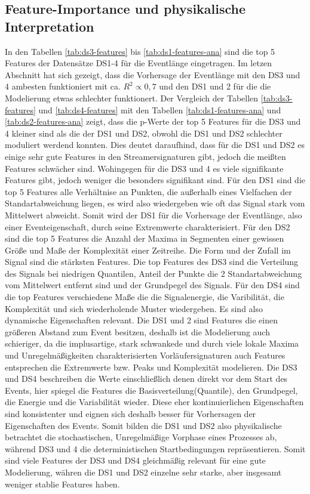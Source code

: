 \subsection{Feature-Importance und physikalische Interpretation}
In den Tabellen \ref{tab:ds3-features} bis \ref{tab:ds1-features-ana} sind die top 5 Features der Datensätze DS1-4 für die Eventlänge eingetragen. Im letzen Abschnitt hat sich gezeigt, dass die Vorhersage der Eventlänge mit den DS3 und 4 ambesten funktioniert mit ca. \(R^2 \propto 0,7\) und den DS1 und 2 für die die Modelierung etwas schlechter funktionert. Der Vergleich der Tabellen \ref{tab:ds3-features} und \ref{tab:ds4-features} mit den Tabellen \ref{tab:ds1-features-ana} und \ref{tab:ds2-features-ana} zeigt, dass die p-Werte der top 5 Features für die DS3 und 4 kleiner sind als die der DS1 und DS2, obwohl die DS1 und DS2 schlechter moduliert werdend konnten. Dies deutet daraufhind, dass für die DS1 und DS2 es einige sehr gute Features in den Streamersignaturen gibt, jedoch die meißten Features schwächer sind. Wohingegen für die DS3 und 4 es viele signifikante Features gibt, jedoch weniger die besonders signifikant sind. Für den DS1 sind die top 5 Features alle Verhältnise an Punkten, die außerhalb eines Vielfachen der Standartabweichung liegen, es wird also wiedergeben wie oft das Signal stark vom Mittelwert abweicht. Somit wird der DS1 für die Vorhersage der Eventlänge, also einer Eventeigenschaft, durch seine Extremwerte charakterisiert. Für den DS2 sind die top 5 Features die Anzahl der Maxima in Segmenten einer gewissen Größe und Maße der Komplexität einer Zeitreihe. Die Form und der Zufall im Signal sind die stärksten Features. Die top Features des DS3 sind die Verteilung des Signals bei niedrigen Quantilen, Anteil der Punkte die 2 Standartabweichung vom Mittelwert entfernt sind und der Grundpegel des Signals. Für den DS4 sind die top Features verschiedene Maße die die Signalenergie, die Varibilität, die Komplexität und sich wiederholende Muster wiedergeben. Es sind also dynamische Eigenschaften relevant. Die DS1 und 2 sind Features die einen größeren Abstand zum Event besitzen, deshalb ist die Modelierung auch schieriger, da die implusartige, stark schwankede und durch viele lokale Maxima und Unregelmäßigkeiten charakterisierten Vorläufersignaturen auch Features entsprechen die Extremwerte bzw. Peaks und Komplexität modelieren. Die DS3 und DS4 beschreiben die Werte einschließlich denen direkt vor dem Start des Events, hier spiegel die Features die Basisverteilung(Quantile), den Grundpegel, die Energie und die Variabilität wieder. Diese eher kontinuierlichen Eigenschaften sind konsistenter und eignen sich deshalb besser für Vorhersagen der Eigenschaften des Events. Somit bilden die DS1 und DS2 also physikalische betrachtet die stochastischen, Unregelmäßige Vorphase eines Prozesses ab, während DS3 und 4 die deterministischen Startbedingungen repräsentieren. Somit sind viele Features der DS3 und DS4 gleichmäßig relevant für eine gute Modelierung, währen die DS1 und DS2 einzelne sehr starke, aber insgesamt weniger stablie Features haben. 


